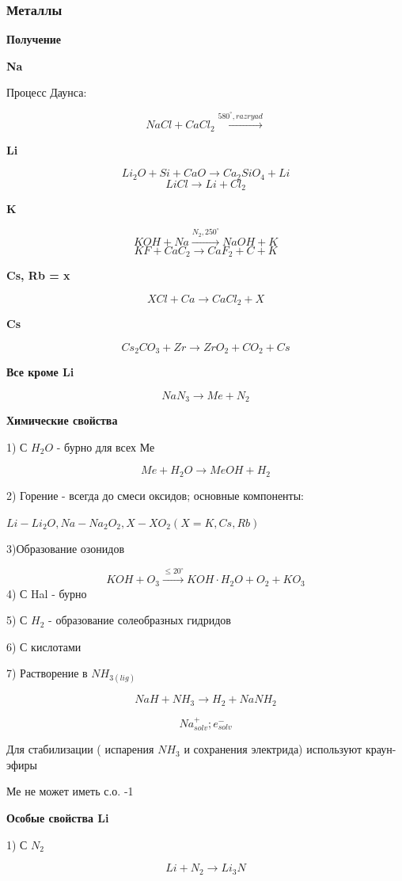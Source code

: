 \documentclass[14pt,a4paper]{scrartcl}
\begin{document}
\subsubsection{Металлы}

\textbf{Получение}

\textbf{Na}

Процесс Даунса:

$$NaCl + CaCl_2 \xrightarrow{580^{\circ}, razryad}$$

\textbf{Li}

$$Li_2O + Si + CaO \rightarrow Ca_2SiO_4  + Li$$
$$LiCl \rightarrow Li + Cl_2$$

\textbf{K}

$$KOH + Na \xrightarrow{N_2, 250^{\circ}} NaOH + K$$
$$KF + CaC_2 \rightarrow CaF_2 + C + K$$

\textbf{Cs, Rb = x}

$$XCl + Ca \rightarrow CaCl_2 + X$$

\textbf{Cs}

$$Cs_2CO_3 + Zr \rightarrow ZrO_2 + CO_2 + Cs$$

\textbf{Все кроме Li}

$$NaN_3 \rightarrow Me + N_2$$

\textbf{Химические свойства}

1) С $H_2O$ - бурно для всех Ме

$$Me + H_2O \rightarrow MeOH + H_2$$

2) Горение - всегда до смеси оксидов; основные компоненты:

$Li-Li_2O, Na - Na_2O_2, X - XO_2 (X = K, Cs, Rb)$

3)Образование озонидов

$$KOH + O_3 \xrightarrow{\leq20^{\circ}} KOH\cdot H_2O + O_2 + KO_3$$
4) С Hal - бурно

5) С $H_2$ - образование солеобразных гидридов

6) С кислотами

7) Растворение в $NH_{3(lig)}$

$$NaH + NH_3 \rightarrow H_2 + NaNH_2$$

$$Na_{solv}^+; e_{solv}^-$$

Для стабилизации ( испарения $NH_3$ и сохранения электрида) используют краун-эфиры

Ме не может иметь с.о. -1

\textbf{Особые свойства Li}

1) С $N_2$

$$Li + N_2 \rightarrow Li_3N$$
\end{document}
